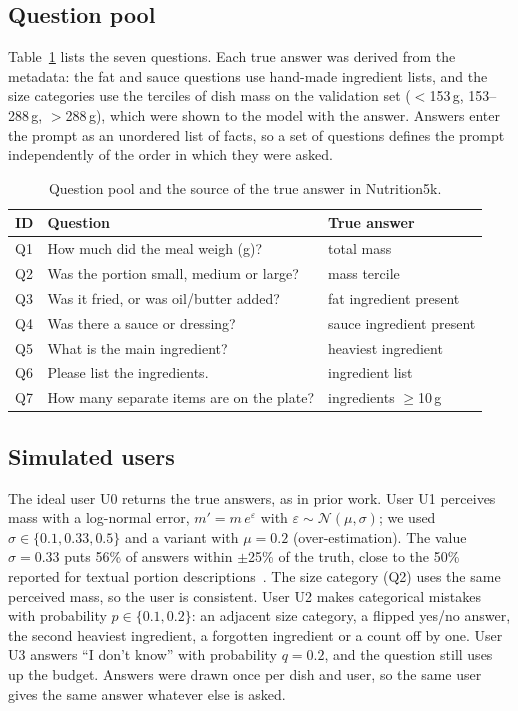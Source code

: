 \documentclass[twocolumn]{svjour3}
\begin{document}
\subsection{Question pool}
Table~\ref{tab:questions} lists the seven questions. Each true answer was derived from the metadata: the
fat and sauce questions use hand-made ingredient lists, and the size categories use the terciles of dish
mass on the validation set ($<$153\,g, 153--288\,g, $>$288\,g), which were shown to the model with the
answer. Answers enter the prompt as an unordered list of facts, so a set of questions defines the prompt
independently of the order in which they were asked.

\begin{table}[t]
  \centering
  \caption{Question pool and the source of the true answer in Nutrition5k.}
  \label{tab:questions}
  \setlength{\tabcolsep}{3pt}
  \begin{tabular}{@{}lp{3.2cm}p{3.1cm}@{}}
    \toprule
    ID & Question & True answer \\
    \midrule
    Q1 & How much did the meal weigh (g)? & total mass \\
    Q2 & Was the portion small, medium or large? & mass tercile \\
    Q3 & Was it fried, or was oil/butter added? & fat ingredient present \\
    Q4 & Was there a sauce or dressing? & sauce ingredient present \\
    Q5 & What is the main ingredient? & heaviest ingredient \\
    Q6 & Please list the ingredients. & ingredient list \\
    Q7 & How many separate items are on the plate? & ingredients $\ge$10\,g \\
    \bottomrule
  \end{tabular}
\end{table}

\subsection{Simulated users}
The ideal user U0 returns the true answers, as in prior work. User U1 perceives mass with a log-normal
error, $m' = m\,e^{\varepsilon}$ with $\varepsilon\sim\mathcal{N}(\mu,\sigma)$; we used $\sigma\in\{0.1, 0.33,
0.5\}$ and a variant with $\mu=0.2$ (over-estimation). The value $\sigma=0.33$ puts 56\% of answers within
$\pm$25\% of the truth, close to the 50\% reported for textual portion descriptions~\cite{lucassen2021portion}.
The size category (Q2) uses the same perceived mass, so the user is consistent. User U2 makes categorical
mistakes with probability $p\in\{0.1, 0.2\}$: an adjacent size category, a flipped yes/no answer, the second
heaviest ingredient, a forgotten ingredient or a count off by one. User U3 answers ``I don't know'' with
probability $q=0.2$, and the question still uses up the budget. Answers were drawn once per dish and user,
so the same user gives the same answer whatever else is asked.
\end{document}
